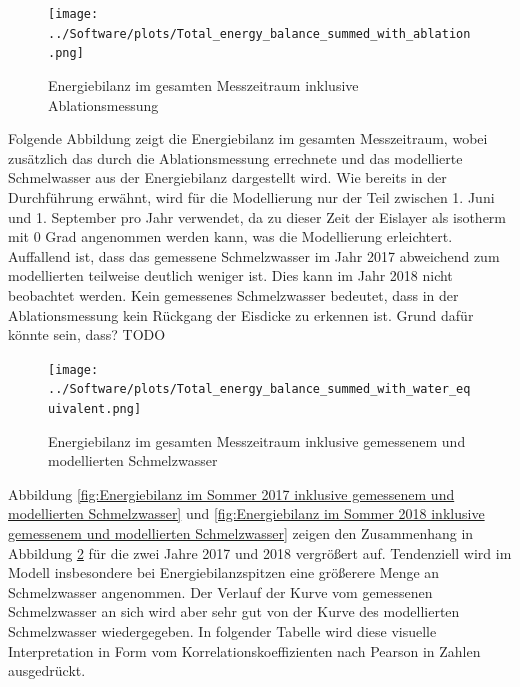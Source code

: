 \documentclass[12pt,a4paper]{article}
\begin{document}
\begin{figure}[H]
\centering
\texttt{[image: ../Software/plots/Total\_energy\_balance\_summed\_with\_ablation.png]}
\caption{Energiebilanz im gesamten Messzeitraum inklusive Ablationsmessung}
\label{fig:Energiebilanz im gesamten Messzeitraum inklusive Ablationsmessung}
\end{figure}


Folgende Abbildung zeigt die Energiebilanz im gesamten Messzeitraum, wobei zusätzlich das durch die Ablationsmessung errechnete und das modellierte Schmelwasser aus der Energiebilanz dargestellt wird. Wie bereits in der Durchführung erwähnt, wird für die Modellierung nur der Teil zwischen 1. Juni und 1. September pro Jahr verwendet, da zu dieser Zeit der Eislayer als isotherm mit 0 Grad angenommen werden kann, was die Modellierung erleichtert. Auffallend ist, dass das gemessene Schmelzwasser im Jahr 2017 abweichend zum modellierten teilweise deutlich weniger ist. Dies kann im Jahr 2018 nicht beobachtet werden. Kein gemessenes Schmelzwasser bedeutet, dass in der Ablationsmessung kein Rückgang der Eisdicke zu erkennen ist. Grund dafür könnte sein, dass? TODO






\begin{figure}[H]
\centering
\texttt{[image: ../Software/plots/Total\_energy\_balance\_summed\_with\_water\_equivalent.png]}
\caption{Energiebilanz im gesamten Messzeitraum inklusive gemessenem und modellierten Schmelzwasser}
\label{fig:Energiebilanz im gesamten Messzeitraum inklusive gemessenem und modellierten Schmelzwasser}
\end{figure}


Abbildung \ref{fig:Energiebilanz im Sommer 2017 inklusive gemessenem und modellierten Schmelzwasser} und \ref{fig:Energiebilanz im Sommer 2018 inklusive gemessenem und modellierten Schmelzwasser} zeigen den Zusammenhang in Abbildung \ref{fig:Energiebilanz im gesamten Messzeitraum inklusive gemessenem und modellierten Schmelzwasser} für die zwei Jahre 2017 und 2018 vergrößert auf. Tendenziell wird im Modell insbesondere bei Energiebilanzspitzen eine größerere Menge an Schmelzwasser angenommen. Der Verlauf der Kurve vom gemessenen Schmelzwasser an sich wird aber sehr gut von der Kurve des modellierten Schmelzwasser wiedergegeben. In folgender Tabelle wird diese visuelle Interpretation in Form vom Korrelationskoeffizienten nach Pearson in Zahlen ausgedrückt. 
\end{document}
